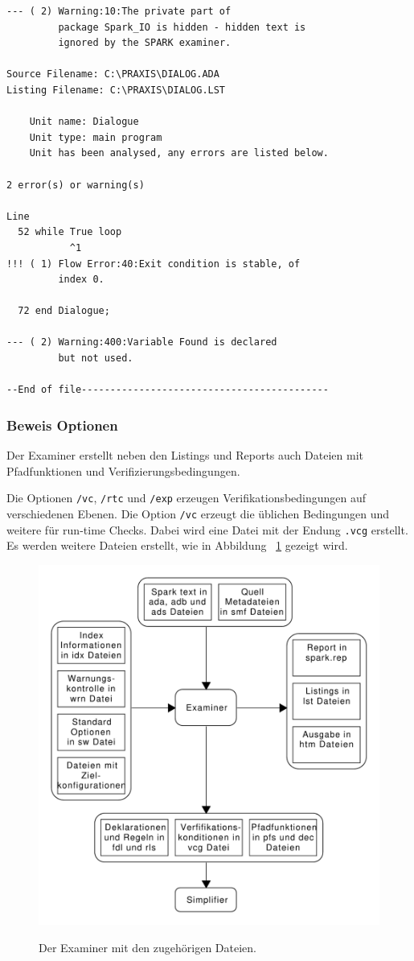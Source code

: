 \begin{verbatim}
--- ( 2) Warning:10:The private part of
         package Spark_IO is hidden - hidden text is 
         ignored by the SPARK examiner.

Source Filename: C:\PRAXIS\DIALOG.ADA
Listing Filename: C:\PRAXIS\DIALOG.LST

    Unit name: Dialogue
    Unit type: main program
    Unit has been analysed, any errors are listed below.

2 error(s) or warning(s)

Line
  52 while True loop
           ^1
!!! ( 1) Flow Error:40:Exit condition is stable, of
         index 0.

  72 end Dialogue;

--- ( 2) Warning:400:Variable Found is declared
         but not used.

--End of file-------------------------------------------
\end{verbatim}

\subsubsection{Beweis Optionen}
Der Examiner erstellt neben den Listings und Reports auch Dateien mit Pfadfunktionen und Verifizierungsbedingungen.

Die Optionen \texttt{/vc}, \texttt{/rtc} und \texttt{/exp} erzeugen Verifikationsbedingungen auf verschiedenen Ebenen. Die Option \texttt{/vc} erzeugt die üblichen Bedingungen und weitere für run-time Checks. Dabei wird eine Datei mit der Endung \texttt{.vcg} erstellt.
Es werden weitere Dateien erstellt, wie in Abbildung ~\ref{fig:examinerFiles} gezeigt wird.

\begin{figure}[h!]
\includegraphics[width=\textwidth{}]{images/examinerFiles.pdf}
\label{fig:examinerFiles}
\caption{Der Examiner mit den zugehörigen Dateien.}
\end{figure}


